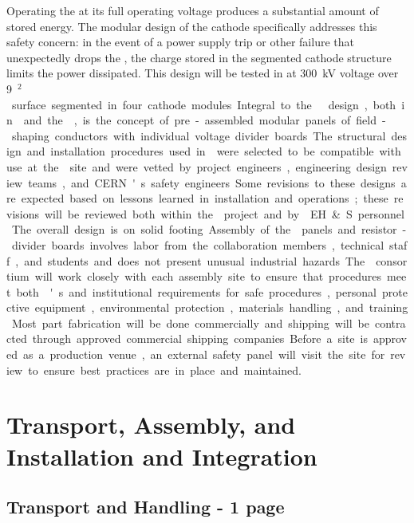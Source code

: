 Operating the  at its full operating voltage produces a substantial amount of stored energy. The modular design of the cathode specifically addresses this safety concern: in the event of a power supply trip or other failure that unexpectedly drops the , the charge stored in the segmented cathode structure limits the power dissipated. 
This design will be tested in  at \SI{300}{kV} voltage over \SI{9}{\m$^2$} surface segmented in four cathode modules.  

Integral to the   design, both in  and the \dpmod, is the concept of pre-assembled modular panels of field-shaping conductors with individual voltage divider boards. The structural design and installation procedures used in  were selected to be compatible with use at the  site and were vetted by project engineers, engineering design review teams, and CERN's safety engineers. Some revisions to these designs are expected based on lessons learned in installation and operations; these revisions will be reviewed both within the  project and by \fnal EH\&S personnel. The overall design is on solid footing. 

Assembly of the  panels and resistor-divider boards involves labor from the collaboration members, technical staff, and students and  does not present unusual industrial hazards. The  consortium will work closely with each assembly site to ensure that procedures meet both \fnal{}'s and institutional requirements for safe procedures, personal protective equipment, environmental protection, %
materials handling, and training. Most %
part fabrication will be done commercially and shipping will be contracted through approved commercial shipping companies. Before a site is approved as a production venue, an external safety panel will visit the site for review to ensure best practices are in place and maintained. 


\section{Transport, Assembly, and Installation and Integration}
\label{sec:fddp-hv-transport}

\subsection{Transport and Handling - 1 page}
\label{sec:fddp-hv-transport-transport}

